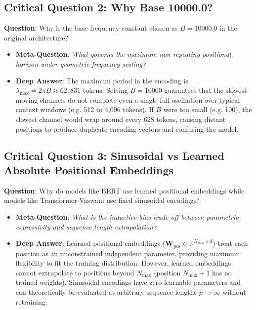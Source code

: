 \documentclass[11pt,a4paper]{article}
\theoremstyle{definition}
\begin{document}
\subsection{\textbf{Critical Question 2: Why Base 10000.0?}}
\textbf{Question}: Why is the base frequency constant chosen as $B = 10000.0$ in the original architecture?
\begin{itemize}
    \item \textbf{Meta-Question}: \emph{What governs the maximum non-repeating positional horizon under geometric frequency scaling?}
    \item \textbf{Deep Answer}: The maximum period in the encoding is $\lambda_{\text{max}} = 2\pi B \approx 62,831$ tokens. Setting $B = 10000$ guarantees that the slowest-moving channels do not complete even a single full oscillation over typical context windows (e.g. 512 to 4,096 tokens). If $B$ were too small (e.g. 100), the slowest channel would wrap around every 628 tokens, causing distant positions to produce duplicate encoding vectors and confusing the model.
\end{itemize}

\subsection{\textbf{Critical Question 3: Sinusoidal vs Learned Absolute Positional Embeddings}}
\textbf{Question}: Why do models like BERT use learned positional embeddings while models like Transformer-Vaswani use fixed sinusoidal encodings?
\begin{itemize}
    \item \textbf{Meta-Question}: \emph{What is the inductive bias trade-off between parametric expressivity and sequence length extrapolation?}
    \item \textbf{Deep Answer}: Learned positional embeddings ($\mathbf{W}_{\text{pos}} \in \mathbb{R}^{N_{\text{max}} \times d}$) treat each position as an unconstrained independent parameter, providing maximum flexibility to fit the training distribution. However, learned embeddings cannot extrapolate to positions beyond $N_{\text{max}}$ (position $N_{\text{max}}+1$ has no trained weights). Sinusoidal encodings have zero learnable parameters and can theoretically be evaluated at arbitrary sequence lengths $p \to \infty$ without retraining.
\end{itemize}
\end{document}
